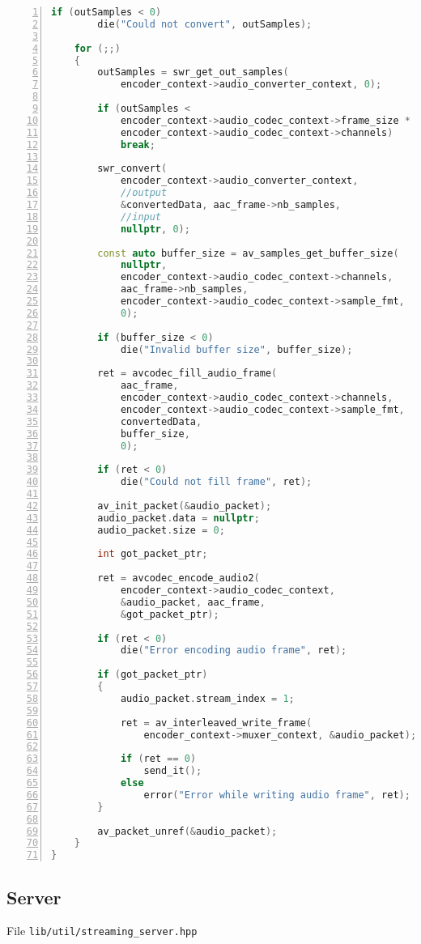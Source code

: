 \begin{lstlisting}[language=C++, numbers=left, tabsize=4]
	if (outSamples < 0)
		die("Could not convert", outSamples);

	for (;;)
	{
		outSamples = swr_get_out_samples(
			encoder_context->audio_converter_context, 0);

		if (outSamples < 
			encoder_context->audio_codec_context->frame_size * 
			encoder_context->audio_codec_context->channels)
			break;

		swr_convert(
			encoder_context->audio_converter_context,
			//output
			&convertedData, aac_frame->nb_samples,
			//input
			nullptr, 0);

		const auto buffer_size = av_samples_get_buffer_size(
			nullptr,
			encoder_context->audio_codec_context->channels,
			aac_frame->nb_samples,
			encoder_context->audio_codec_context->sample_fmt,
			0);

		if (buffer_size < 0)
			die("Invalid buffer size", buffer_size);

		ret = avcodec_fill_audio_frame(
			aac_frame,
			encoder_context->audio_codec_context->channels,
			encoder_context->audio_codec_context->sample_fmt,
			convertedData,
			buffer_size,
			0);

		if (ret < 0)
			die("Could not fill frame", ret);

		av_init_packet(&audio_packet);
		audio_packet.data = nullptr;
		audio_packet.size = 0;

		int got_packet_ptr;

		ret = avcodec_encode_audio2(
			encoder_context->audio_codec_context, 
			&audio_packet, aac_frame, 
			&got_packet_ptr);

		if (ret < 0)
			die("Error encoding audio frame", ret);

		if (got_packet_ptr)
		{
			audio_packet.stream_index = 1;

			ret = av_interleaved_write_frame(
				encoder_context->muxer_context, &audio_packet);

			if (ret == 0)
				send_it();
			else
				error("Error while writing audio frame", ret);
		}

		av_packet_unref(&audio_packet);
	}
}
\end{lstlisting}


\newpage
\subsection{Server}
File \verb|lib/util/streaming_server.hpp|

